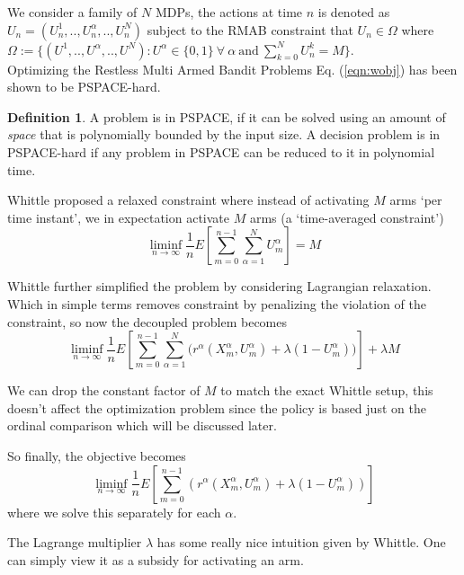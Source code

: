 \documentclass{article}
\theoremstyle{definition}
\newtheorem{definition}{Definition}[section]
\begin{document}
We consider a family of $N$ MDPs, the actions at time $n$ is denoted as $U_n = (U_n^1,..,U_n^\alpha,..,U_n^N)$ subject to the RMAB constraint that $U_n \in \Omega$ where $\Omega:=\{(U^1,..,U^\alpha,..,U^N): U^\alpha\in\{0,1\}\ \forall\ \alpha\ \text{and}\ \sum_{k=0}^N U_n^k = M\}$.\\ 

Optimizing the Restless Multi Armed Bandit Problems Eq. (\ref{eqn:wobj}) has been shown to be PSPACE-hard. 

\begin{definition}
A problem is in PSPACE, if it can be solved using an amount of \textit{space} that is polynomially bounded by the input size. A decision problem is in PSPACE-hard if any problem in PSPACE can be reduced to it in polynomial time.
\end{definition}

Whittle \cite{whittlepaper} proposed a relaxed constraint where instead of activating $M$ arms `per time instant', we in expectation activate $M$ arms (a `time-averaged constraint')
\begin{equation}
\liminf_{n\rightarrow\infty}\frac{1}{n}E\left[\sum_{m=0}^{n-1}\sum_{\alpha=1}^NU^\alpha_m\right] = M \label{constraint2}
\end{equation}

Whittle further simplified the problem by considering Lagrangian relaxation. Which in simple terms removes constraint by penalizing the violation of the constraint, so now the decoupled problem becomes
\begin{equation}
\liminf_{n\rightarrow\infty}\frac{1}{n}E\left[\sum_{m=0}^{n-1}\sum_{\alpha=1}^N\Big(r^\alpha(X^\alpha_m, U^\alpha_m)+\lambda(1-U_m^\alpha)\Big)\right]+\lambda M \label{reward}
\end{equation}

We can drop the constant factor of $M$ to match the exact Whittle setup, this doesn't affect the optimization problem since the policy is based just on the ordinal comparison which will be discussed later.

So finally, the objective becomes
 \begin{equation}
\liminf_{n\rightarrow\infty}\frac{1}{n}E\left[\sum_{m=0}^{n-1}(r^\alpha(X^\alpha_m, U^\alpha_m) + \lambda(1 - U_m^\alpha)) \right] \label{eq:whittlereward}
\end{equation}
where we solve this separately for each $\alpha$.

The Lagrange multiplier $\lambda$ has some really nice intuition given by Whittle. One can simply view it as a subsidy for activating an arm.
\end{document}

